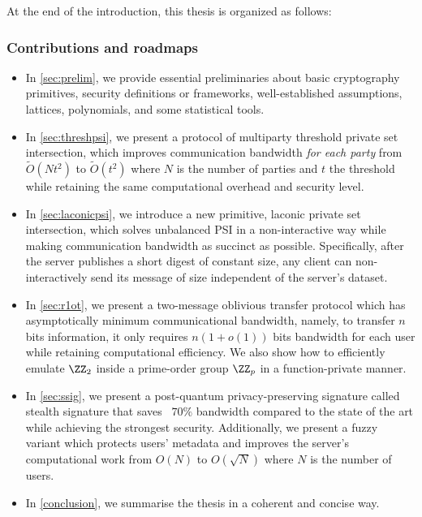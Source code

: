 At the end of the introduction,
this thesis is organized as follows:
\subsubsection{Contributions and roadmaps}
\begin{itemize}
    \item In \cref{sec:prelim}, we provide essential preliminaries about basic cryptography primitives, security definitions or frameworks, well-established assumptions, lattices, polynomials, and some statistical tools.
    \item In \cref{sec:threshpsi}, we present a protocol of multiparty threshold private set intersection, which improves communication bandwidth \emph{for each party} from $\tilde{O}(Nt^2)$ to $\tilde{O}(t^2)$ where $N$ is the number of parties and $t$ the threshold while retaining the same computational overhead and security level.
    \item In \cref{sec:laconicpsi}, we introduce a new primitive, laconic private set intersection, which solves unbalanced PSI in a non-interactive way while making communication bandwidth as succinct as possible. Specifically, after the server publishes a short digest of constant size, any client can non-interactively send its message of size independent of the server's dataset.
    \item In \cref{sec:r1ot}, we present a two-message oblivious transfer protocol which has asymptotically minimum communicational bandwidth, namely, to transfer $n$ bits information, it only requires $n(1+o(1))$ bits bandwidth for each user while retaining computational efficiency. We also show how to efficiently emulate $\ZZ_2$ inside a prime-order group $\ZZ_p$ in a function-private manner.
    \item In \cref{sec:ssig}, we present a post-quantum privacy-preserving signature called stealth signature that saves ~$70\%$ bandwidth compared to the state of the art while  achieving the strongest security. Additionally, we present a fuzzy variant which protects users' metadata and improves the server's computational work from $O(N)$ to $O(\sqrt{N})$ where $N$ is the number of users.
    \item In \cref{conclusion}, we summarise the thesis in a coherent and concise way.
\end{itemize}

